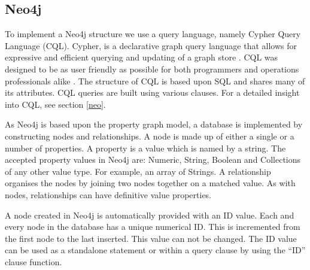 \subsection{Neo4j}
To implement a Neo4j structure we use a query language, namely Cypher Query Language (CQL). Cypher, is a declarative graph query language that allows for expressive and efficient querying and updating of a graph store \cite{nd}. CQL was designed to be as user friendly as possible for both programmers and operations professionals alike \cite{nd}. The structure of CQL is based upon SQL and shares many of its attributes. CQL queries are built using various clauses. For a detailed insight into CQL, see section \ref{neo}.

As Neo4j is based upon the property graph model, a database is implemented by constructing nodes and relationships. A node is made up of either a single or a number of properties. A property is a value which is named by a string. The accepted property values in Neo4j are: Numeric, String, Boolean and Collections of any other value type. For example, an array of Strings. A relationship organises the nodes by joining two nodes together on a matched value. As with nodes, relationships can have definitive value properties.

A node created in Neo4j is automatically provided with an ID value. Each and every node in the database has a unique numerical ID. This is incremented from the first node to the last inserted. This value can not be changed. The ID value can be used as a standalone statement or within a query clause by using the ``ID'' clause function.

